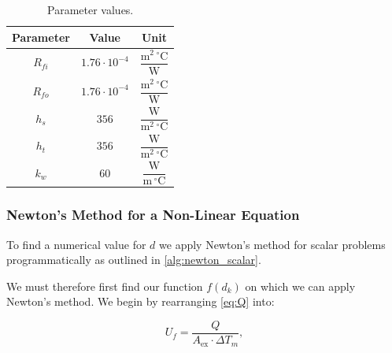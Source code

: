 \documentclass[11pt, a4paper]{article}
\theoremstyle{definition}
\begin{document}
\begin{table}[H]
  \centering
  \begin{tabular}{@{}ccc@{}}
    \toprule
    Parameter & Value & Unit \\
    \midrule
    $R_{fi}$ & $1.76 \cdot 10^{-4}$ & $\dfrac{\mathrm{m}^2\,{^\circ}\mathrm{C}}{\mathrm{W}}$ \\[10pt]
    $R_{fo}$ & $1.76 \cdot 10^{-4}$ & $\dfrac{\mathrm{m}^2\,{^\circ}\mathrm{C}}{\mathrm{W}}$ \\[10pt]
    $h_s$    & $356$                 & $\dfrac{\mathrm{W}}{\mathrm{m}^2\,{^\circ}\mathrm{C}}$ \\[10pt]
    $h_t$    & $356$                 & $\dfrac{\mathrm{W}}{\mathrm{m}^2\,{^\circ}\mathrm{C}}$ \\[10pt]
    $k_w$    & $60$                  & $\dfrac{\mathrm{W}}{\mathrm{m}\,{^\circ}\mathrm{C}}$   \\[6pt]
    \bottomrule
  \end{tabular}
  \caption{Parameter values.}
  \label{tab:params1}
\end{table}

\subsubsection{Newton's Method for a Non-Linear Equation}

To find a numerical value for $d$ we apply Newton's method for scalar problems
programmatically as outlined in \cref{alg:newton_scalar}.

\begin{algorithm}[H]
  \caption{Newton's method -- scalar equation}
  \label{alg:newton_scalar}
  \begin{algorithmic}
    \ENDWHILE
  \end{algorithmic}
\end{algorithm}

We must therefore first find our function $f(d_k)$ on which we can apply Newton's method.
We begin by rearranging \cref{eq:Q} into:

\begin{equation}
    U_f = \frac{Q}{A_{\mathrm{ex}}\cdot \Delta T_m},
    \label{eq:U_f2}
\end{equation}
\end{document}
